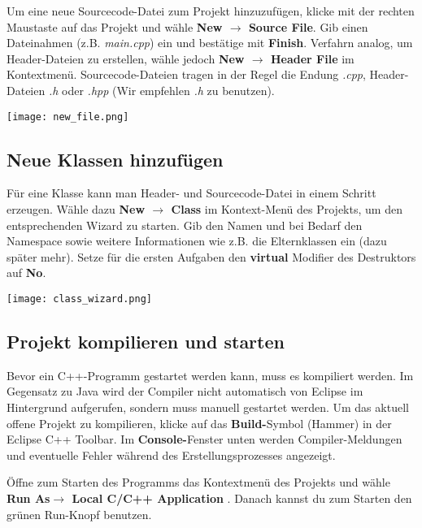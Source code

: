 Um eine neue Sourcecode-Datei zum Projekt hinzuzufügen, klicke mit der rechten Maustaste auf das Projekt und wähle \textbf{New $\rightarrow$ Source File}.
Gib einen Dateinahmen (z.B. \emph{main.cpp}) ein und bestätige mit 
\textbf{Finish}. 
Verfahrn analog, um Header-Dateien zu erstellen, wähle jedoch \textbf{New $\rightarrow$ Header File} im Kontextmenü.
Sourcecode-Dateien tragen in der Regel die Endung \emph{.cpp}, Header-Dateien \emph{.h} oder \emph{.hpp} (Wir empfehlen \emph{.h} zu benutzen).

\begin{center}
	\texttt{[image: new\_file.png]}
\end{center}

\subsection{Neue Klassen hinzufügen}

Für eine Klasse kann man Header- und Sourcecode-Datei in einem Schritt erzeugen.
Wähle dazu \textbf{New $\rightarrow$ Class} im Kontext-Menü des Projekts, um den entsprechenden Wizard zu starten.
Gib den Namen und bei Bedarf den Namespace sowie weitere Informationen wie z.B. die Elternklassen ein (dazu später mehr).
Setze für die ersten Aufgaben den \textbf{virtual} Modifier des Destruktors auf \textbf{No}.

\begin{center}
	\texttt{[image: class\_wizard.png]}
\end{center}

\subsection{Projekt kompilieren und starten}

Bevor ein C++-Programm gestartet werden kann, muss es kompiliert werden.
Im Gegensatz zu Java wird der Compiler nicht automatisch von Eclipse im Hintergrund aufgerufen, sondern muss manuell gestartet werden.
Um das aktuell offene Projekt zu kompilieren, klicke auf das \textbf{Build-}Symbol (\glqq Hammer\grqq) in der Eclipse C++ Toolbar.
Im \textbf{Console-}Fenster unten werden Compiler-Meldungen und eventuelle Fehler während des Erstellungsprozesses angezeigt.

Öffne zum Starten des Programms das Kontextmenü des Projekts und wähle \textbf{Run As$\rightarrow$ Local C/C++ Application }.
Danach kannst du zum Starten den grünen Run-Knopf benutzen.

